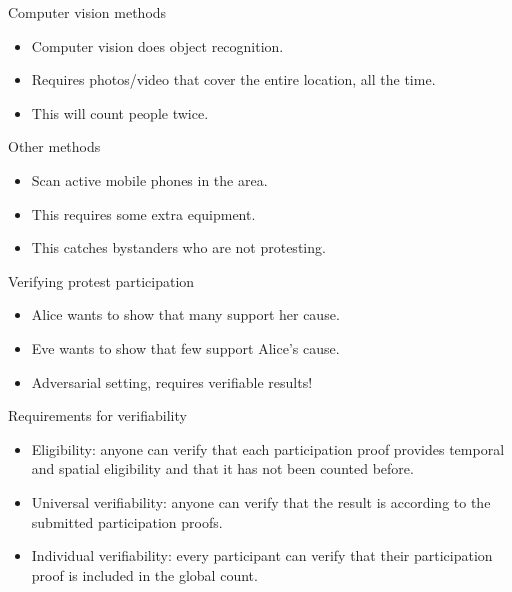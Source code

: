 \begin{columns}[t]
\begin{column}{0.32\linewidth}
    \begin{whiteblock}{Computer vision methods}
      \begin{itemize}
        \item Computer vision does object recognition.
        \item Requires photos/video that cover the entire location, all the time.
        \item \color{red} This will count people twice.
      \end{itemize}
    \end{whiteblock}

    \begin{whiteblock}{Other methods}
      \begin{itemize}
        \item Scan active mobile phones in the area.
        \item This requires some extra equipment.
        \item \color{red} This catches bystanders who are not protesting.
      \end{itemize}
    \end{whiteblock}

    \begin{redblock}{Verifying protest participation}
      \begin{itemize}
        \item Alice wants to show that many support her cause.
        \item Eve wants to show that few support Alice's cause.
        \item \color{red} Adversarial setting, requires verifiable results!
      \end{itemize}
    \end{redblock}

    \begin{blueblock}{Requirements for verifiability}
      \begin{itemize}
        \item\label{EligibilityVerif} Eligibility: anyone can verify that each 
          participation proof provides temporal and spatial eligibility and that 
          it has not been counted before.

        \item\label{UniversalVerif} Universal verifiability: anyone can verify 
          that the result is according to the submitted participation proofs.

        \item\label{IndividualVerif} Individual verifiability: every participant 
          can verify that their participation proof is included in the global 
          count.
      \end{itemize}
    \end{blueblock}


\end{column}
\end{columns}
